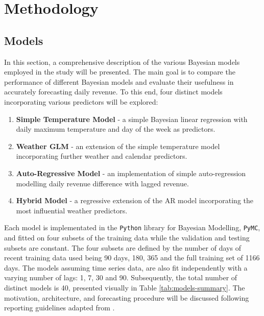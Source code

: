 \section{Methodology}

\subsection{Models}
In this section, a comprehensive description of the various Bayesian models
employed in the study will be presented. The main goal is to compare the
performance of different Bayesian models and evaluate their usefulness in
accurately forecasting daily revenue. To this end, four distinct models
incorporating various predictors will be explored: 
\begin{enumerate}
  \item \textbf{Simple Temperature Model} - a simple Bayesian linear regression
    with daily maximum temperature and day of the week as predictors.
  \item \textbf{Weather GLM} - an extension of the simple temperature model
    incorporating further weather and calendar predictors.
  \item \textbf{Auto-Regressive Model} - an implementation of simple
    auto-regression modelling daily revenue difference with lagged revenue.
  \item \textbf{Hybrid Model} - a regressive extension of the AR model incorporating
    the most influential weather predictors.
\end{enumerate}
Each model is implementated in the \texttt{Python} library for Bayesian
Modelling, \texttt{PyMC}, and fitted on four subsets of the training data while
the validation and testing subsets are constant. The four subsets are defined
by the number of days of recent training data used being 90 days, 180, 365 and
the full training set of 1166 days. The models assuming time series data, are
also fit independently with a varying number of lags: 1, 7, 30 and 90.
Subsequently, the total number of distinct models is 40, presented visually in
Table \ref{tab:models-summary}. The motivation, architecture, and forecasting
procedure will be discussed following reporting guidelines adapted from
\cite{clinical}. 
